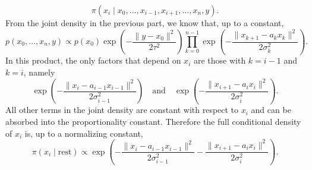 \documentclass[answers,12pt,addpoints]{exam}
\begin{document}
\begin{enumerate}
\begin{enumerate}
\begin{solution}
\[
\pi(x_i \mid x_0,\dots,x_{i-1},x_{i+1},\dots,x_n,y).
\]
From the joint density in the previous part, we know that, up to a constant,
\[
p(x_0,\dots,x_n,y)
\propto
p(x_0)
\exp\!\left(
-\frac{\|y - x_0\|^2}{2\tau^2}
\right)
\prod_{k=0}^{n-1}
\exp\!\left(
-\frac{\|x_{k+1} - a_k x_k\|^2}{2\sigma_k^2}
\right).
\]
In this product, the only factors that depend on $x_i$ are those with $k=i-1$
and $k=i$, namely
\[
\exp\!\left(
-\frac{\|x_i - a_{i-1} x_{i-1}\|^2}{2\sigma_{i-1}^2}
\right)
\quad\text{and}\quad
\exp\!\left(
-\frac{\|x_{i+1} - a_i x_i\|^2}{2\sigma_i^2}
\right).
\]
All other terms in the joint density are constant with respect to $x_i$ and can
be absorbed into the proportionality constant. Therefore the full conditional
density of $x_i$ is, up to a normalizing constant,
\[
\pi(x_i \mid \text{rest})
\propto
\exp\!\left(
-\frac{\|x_i - a_{i-1} x_{i-1}\|^2}{2\sigma_{i-1}^2}
-\frac{\|x_{i+1} - a_i x_i\|^2}{2\sigma_i^2}
\right).
\]


\end{solution}
\end{enumerate}
\end{enumerate}
\end{document}
